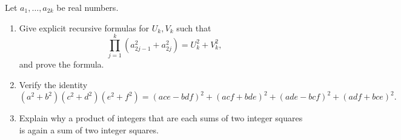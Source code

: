 Let $a_1,\ldots,a_{2k}$ be real numbers.
\begin{enumerate}
\item Give explicit recursive formulas for $U_k,V_k$ such that
\[
\prod_{j=1}^k(a_{2j-1}^2+a_{2j}^2)=U_k^2+V_k^2,
\]
and prove the formula.
\item Verify the identity
\[
(a^2+b^2)(c^2+d^2)(e^2+f^2)
=(ace-bdf)^2+(acf+bde)^2+(ade-bcf)^2+(adf+bce)^2.
\]
\item Explain why a product of integers that are each sums of two integer squares is again a sum of two integer squares.
\end{enumerate}
